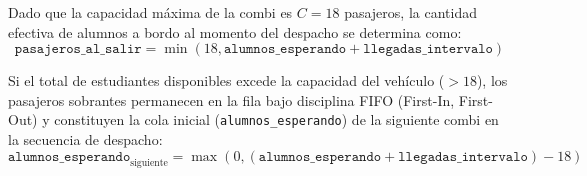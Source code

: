 Dado que la capacidad máxima de la combi es $C = 18$ pasajeros, la cantidad efectiva de alumnos a bordo al momento del despacho se determina como:
\begin{equation}
    \texttt{pasajeros\_al\_salir} = \min\left(18, \texttt{alumnos\_esperando} + \texttt{llegadas\_intervalo}\right)
\end{equation}

Si el total de estudiantes disponibles excede la capacidad del vehículo ($> 18$), los pasajeros sobrantes permanecen en la fila bajo disciplina FIFO (First-In, First-Out) y constituyen la cola inicial (\texttt{alumnos\_esperando}) de la siguiente combi en la secuencia de despacho:
\begin{equation}
    \texttt{alumnos\_esperando}_{\text{siguiente}} = \max\left(0, \left(\texttt{alumnos\_esperando} + \texttt{llegadas\_intervalo}\right) - 18\right)
\end{equation}

\newpage
